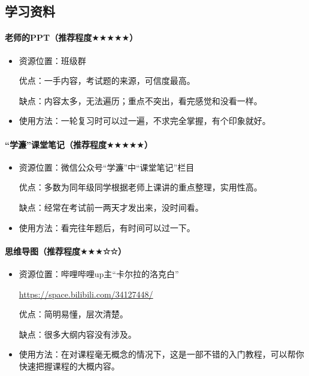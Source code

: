 \documentclass[zihao=-4,fontset=none]{Beautybook-CN}
\begin{document}
\subsection{学习资料}

\paragraph{\textbf{老师的PPT\textnormal{（推荐程度${\bigstar}$${\bigstar}$${\bigstar}$${\bigstar}$${\bigstar}$）}}}


\begin{itemize}
	\item 资源位置：班级群
	      	      
	      优点：一手内容，考试题的来源，可信度最高。
	      	      
	      缺点：内容太多，无法遍历；重点不突出，看完感觉和没看一样。
	\item 使用方法：一轮复习时可以过一遍，不求完全掌握，有个印象就好。
\end{itemize}
\paragraph{\textbf{“学濂”课堂笔记\textnormal{（推荐程度${\bigstar}$${\bigstar}$${\bigstar}$${\bigstar}$${\bigstar}$）}}}


\begin{itemize}
	\item 资源位置：微信公众号“学濂”中“课堂笔记”栏目
	      	      
	      优点：多数为同年级同学根据老师上课讲的重点整理，实用性高。
	      	      
	      缺点：经常在考试前一两天才发出来，没时间看。
	\item 使用方法：看完往年题后，有时间可以过一下。
\end{itemize}
\paragraph{\textbf{思维导图\textnormal{（推荐程度${\bigstar}$${\bigstar}$${\bigstar}$☆☆）}}}


\begin{itemize}
	\item 资源位置：哔哩哔哩up主“卡尔拉的洛克白”
	      	      
	      \url{https://space.bilibili.com/34127448/}
	      	      
	      优点：简明易懂，层次清楚。
	      	      
	      缺点：很多大纲内容没有涉及。
	\item 使用方法：在对课程毫无概念的情况下，这是一部不错的入门教程，可以帮你快速把握课程的大概内容。
\end{itemize}
\end{document}
